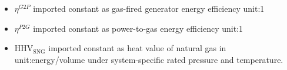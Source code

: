 \begin{itemize}

\item $\eta^{G2P}$ \gls{imported} constant as gas-fired generator
energy efficiency \gls{unit:1}

\item $\eta^{P2G}$ \gls{imported} constant as power-to-gas energy efficiency
\gls{unit:1}

\item $\text{HHV}_\text{SNG}$ \gls{imported}
constant as heat value of natural gas in \gls{unit:energy/volume} under
  system-specific rated pressure and temperature.

\end{itemize}
